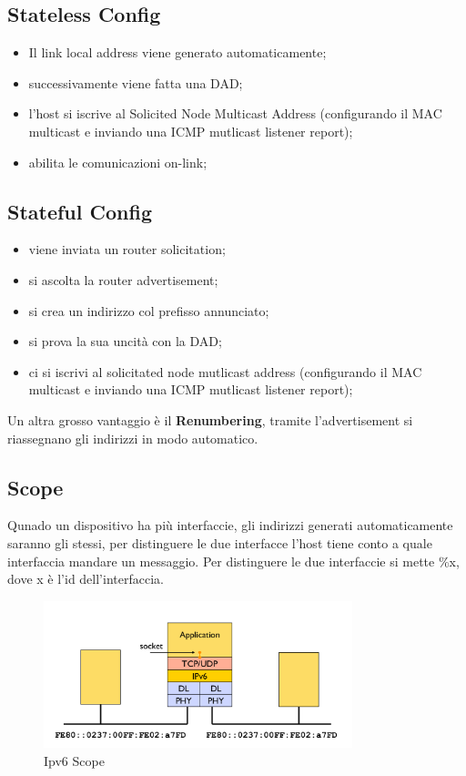 \documentclass[12pt]{article}
\begin{document}
\subsection{Stateless Config}
\begin{itemize}
    \item Il link local address viene generato automaticamente;
    \item successivamente viene fatta una DAD;
    \item l'host si iscrive al Solicited Node Multicast Address (configurando il MAC multicast e inviando una ICMP mutlicast listener report);
    \item abilita le comunicazioni on-link;
\end{itemize}

\subsection{Stateful Config}
\begin{itemize}
    \item viene inviata un router solicitation;
    \item si ascolta la router advertisement;
    \item si crea un indirizzo col prefisso annunciato;
    \item si prova la sua uncit\`a con la DAD;
    \item ci si iscrivi al solicitated node mutlicast address (configurando il MAC multicast e inviando una ICMP mutlicast listener report);
\end{itemize}

Un altra grosso vantaggio \`e il \textbf{Renumbering}, tramite l'advertisement si riassegnano gli indirizzi in modo automatico.


\subsection{Scope}
Qunado un dispositivo ha pi\`u interfaccie, gli indirizzi generati automaticamente saranno gli stessi, per distinguere le due interfacce l'host tiene conto a quale interfaccia mandare un messaggio. Per distinguere le due interfaccie si mette \%x, dove x \`e l'id dell'interfaccia.
\begin{figure}[H]
    \centering
    \includegraphics[width=0.8\textwidth]{ipv6-scope.png}
    \caption{Ipv6 Scope}
    \label{fig:ipv6-scope}
\end{figure}
\end{document}
